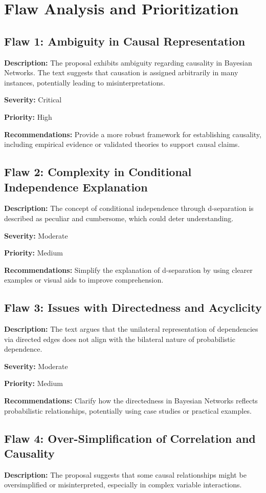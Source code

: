 \documentclass{article}
\begin{document}
\section*{Flaw Analysis and Prioritization}

\subsection*{Flaw 1: Ambiguity in Causal Representation}
\textbf{Description:} The proposal exhibits ambiguity regarding causality in Bayesian Networks. The text suggests that causation is assigned arbitrarily in many instances, potentially leading to misinterpretations.

\textbf{Severity:} Critical

\textbf{Priority:} High

\textbf{Recommendations:} Provide a more robust framework for establishing causality, including empirical evidence or validated theories to support causal claims.

\subsection*{Flaw 2: Complexity in Conditional Independence Explanation}
\textbf{Description:} The concept of conditional independence through d-separation is described as peculiar and cumbersome, which could deter understanding.

\textbf{Severity:} Moderate

\textbf{Priority:} Medium

\textbf{Recommendations:} Simplify the explanation of d-separation by using clearer examples or visual aids to improve comprehension.

\subsection*{Flaw 3: Issues with Directedness and Acyclicity}
\textbf{Description:} The text argues that the unilateral representation of dependencies via directed edges does not align with the bilateral nature of probabilistic dependence.

\textbf{Severity:} Moderate

\textbf{Priority:} Medium

\textbf{Recommendations:} Clarify how the directedness in Bayesian Networks reflects probabilistic relationships, potentially using case studies or practical examples.

\subsection*{Flaw 4: Over-Simplification of Correlation and Causality}
\textbf{Description:} The proposal suggests that some causal relationships might be oversimplified or misinterpreted, especially in complex variable interactions.
\end{document}
